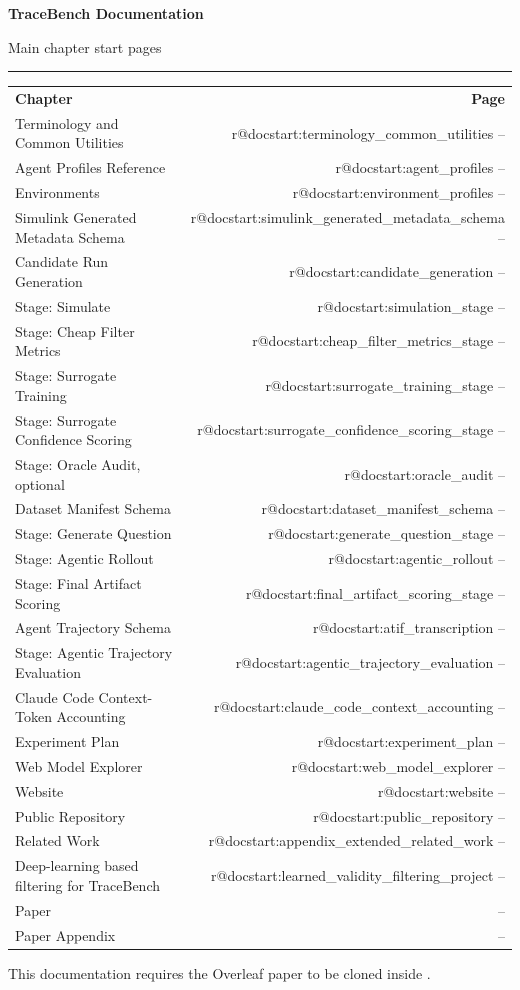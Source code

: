 \documentclass[11pt]{article}
\begin{document}
\suppressManualDocCenteredTitle
{}
\providecommand{\manualDocPaperStartPage}{--}
\providecommand{\manualDocPaperAppendixStartPage}{--}

\newcommand{\chapterstartpage}[1]{%
  \ifcsname r@#1\endcsname
    \pageref{#1}%
  \else
    --%
  \fi
}
\newcommand{\indexrow}[2]{%
  #1 & \chapterstartpage{#2} \\[0.32em]
}
\newcommand{\indexrowvalue}[2]{%
  #1 & #2 \\[0.32em]
}

\vspace{0.25em}
{\fontsize{24}{28}\selectfont\bfseries TraceBench Documentation\par}
\vspace{0.35em}
{\large Main chapter start pages\par}
\vspace{0.6em}
\noindent\rule{\textwidth}{0.6pt}
\vspace{0.8em}

\begingroup
\setlength{\tabcolsep}{0pt}
\renewcommand{\arraystretch}{0.96}

{\normalsize
\begin{tabular*}{\textwidth}{@{\extracolsep{\fill}}lr@{}}
\textbf{Chapter} & \textbf{Page} \\[0.45em]
\indexrow{Terminology and Common Utilities}{docstart:terminology_common_utilities}
\indexrow{Agent Profiles Reference}{docstart:agent_profiles}
\indexrow{Environments}{docstart:environment_profiles}
\indexrow{Simulink Generated Metadata Schema}{docstart:simulink_generated_metadata_schema}
\indexrow{Candidate Run Generation}{docstart:candidate_generation}
\indexrow{Stage: Simulate}{docstart:simulation_stage}
\indexrow{Stage: Cheap Filter Metrics}{docstart:cheap_filter_metrics_stage}
\indexrow{Stage: Surrogate Training}{docstart:surrogate_training_stage}
\indexrow{Stage: Surrogate Confidence Scoring}{docstart:surrogate_confidence_scoring_stage}
\indexrow{Stage: Oracle Audit, optional}{docstart:oracle_audit}
\indexrow{Dataset Manifest Schema}{docstart:dataset_manifest_schema}
\indexrow{Stage: Generate Question}{docstart:generate_question_stage}
\indexrow{Stage: Agentic Rollout}{docstart:agentic_rollout}
\indexrow{Stage: Final Artifact Scoring}{docstart:final_artifact_scoring_stage}
\indexrow{Agent Trajectory Schema}{docstart:atif_transcription}
\indexrow{Stage: Agentic Trajectory Evaluation}{docstart:agentic_trajectory_evaluation}
\indexrow{Claude Code Context-Token Accounting}{docstart:claude_code_context_accounting}
\indexrow{Experiment Plan}{docstart:experiment_plan}
\indexrow{Web Model Explorer}{docstart:web_model_explorer}
\indexrow{Website}{docstart:website}
\indexrow{Public Repository}{docstart:public_repository}
\indexrow{Related Work}{docstart:appendix_extended_related_work}
\indexrow{Deep-learning based filtering for TraceBench}{docstart:learned_validity_filtering_project}
\indexrowvalue{Paper}{\manualDocPaperStartPage}
\indexrowvalue{Paper Appendix}{\manualDocPaperAppendixStartPage}
\end{tabular*}
}
\endgroup

\vspace{0.4em}
This documentation requires the Overleaf paper to be cloned inside .
\end{document}

